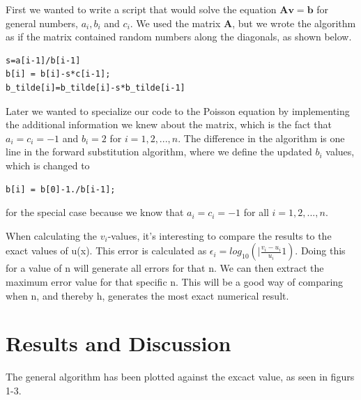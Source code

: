 \documentclass[%
oneside,                 %
final,                   %
10pt]{article}
\begin{document}
First we wanted to write a script that would solve the equation $\mathbf{Av}=\mathbf{b}$ for general numbers,
$a_i, b_i$ and $c_i$. We used the matrix $\mathbf A$, but we wrote the algorithm as if the matrix contained random numbers along the diagonals, as shown below.
\begin{lstlisting}
s=a[i-1]/b[i-1]
b[i] = b[i]-s*c[i-1];
b_tilde[i]=b_tilde[i]-s*b_tilde[i-1]
\end{lstlisting}

Later we wanted to specialize our code to the Poisson equation by implementing the additional information we knew about the matrix, which is the fact that $a_i=c_i=-1$ and $b_i=2$ for $i=1, 2, ..., n$. The difference in the algorithm is one line in the forward substitution algorithm, where we define the updated $b_i$ values, which is changed to

\begin{lstlisting}
b[i] = b[0]-1./b[i-1];
\end{lstlisting}
for the special case because we know that $a_i=c_i=-1$ for all $i=1, 2, ..., n$.

When calculating the $v_i$-values, it's interesting to compare the results to the exact values of u(x). This error is calculated as $\epsilon_{i}=log_{10}(|\frac{v_i-u_i}{u_i}1)$. Doing this for a value of n will generate all errors for that n. We can then extract the maximum error value for that specific n. This will be a good way of comparing when n, and thereby h, generates the most exact numerical result.


\newpage{}
\section{Results and Discussion}

The general algorithm has been plotted against the excact value, as seen in figurs 1-3.
\end{document}
